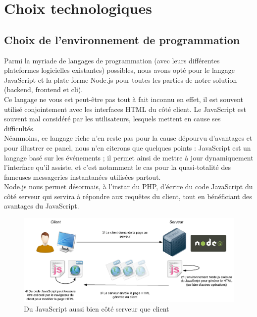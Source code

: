 \section{Choix technologiques}
\label{section:choixTechnologiques}

\subsection*{Choix de l'environnement de programmation}

Parmi la myriade de langages de programmation (avec leurs différentes plateformes logicielles existantes) possibles, nous avons opté pour le langage JavaScript et la plate-forme Node.js pour toutes les parties de notre solution (\Gls{backend}, \Gls{frontend} et \Gls{cli}). \\

Ce langage ne vous est peut-être pas tout à fait inconnu en effet, il est souvent utilisé conjointement avec les interfaces HTML du côté client. Le JavaScript est souvent mal considéré par les utilisateurs, lesquels mettent en cause ses difficultés. \\

Néanmoins, ce langage riche n’en reste pas pour la cause dépourvu d’avantages et pour illustrer ce panel, nous n'en citerons que quelques points : JavaScript est un langage basé sur les événements ; il permet ainsi de mettre à jour dynamiquement l’interface qu’il assiste, et c’est notamment le cas pour la quasi-totalité des fameuses messageries instantanées utilisées partout.\\

Node.js nous permet désormais, à l'instar du PHP, d'écrire du code JavaScript du côté serveur qui servira à répondre aux requêtes du client, tout en bénéficiant des avantages du JavaScript. \\

\begin{figure}[H]
    \includegraphics[width=\textwidth,height=0.24\textheight,keepaspectratio]{images/SchemaNodejs.png}
    \centering
    \caption[Du JavaScript aussi bien côté serveur que client]{Du JavaScript aussi bien côté serveur que client~\cite{NodejsIllustrations}}
    \label{pic:WhatIsNodeJs}
\end{figure}

